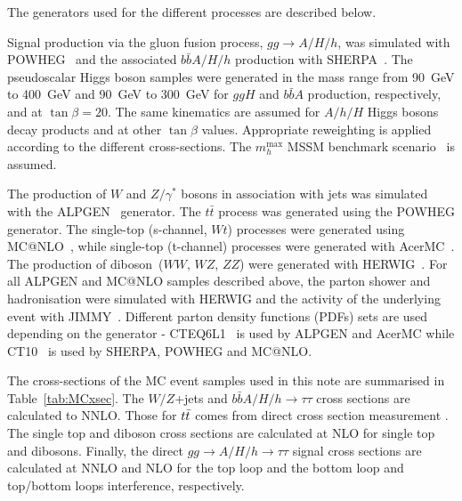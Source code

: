 The generators used for the different processes are described below.

Signal production via the gluon fusion process, $gg\rightarrow A/H/h$,
was simulated with POWHEG~\cite{POWHEG} and the associated
$b\bar{b}A/H/h$ production with SHERPA~\cite{SHERPA}.  The
pseudoscalar Higgs boson samples were generated in the mass range from
90~GeV to 400~GeV and 90~GeV to 300~GeV for $ggH$ and $b\bar{b}A$
production, respectively, and at $\tan\beta = 20$. The same kinematics
are assumed for $A/h/H$ Higgs bosons decay products and at other
$\tan\beta$ values. Appropriate reweighting is applied according to the
different cross-sections. The $m_h^{\mathrm{max}}$ MSSM benchmark
scenario~\cite{MSSMmhmax} is assumed.

The production of $W$ and $Z/\gamma^*$ bosons in association with jets
was simulated with the ALPGEN~\cite{Alpgen} generator. 
The $t\bar{t}$ process was generated using the POWHEG generator. The single-top (s-channel, $Wt$)
processes were generated using MC@NLO~\cite{MCatNLO}, while single-top
(t-channel) processes were generated with AcerMC~\cite{AcerMC}.  The
production of diboson~($WW$, $WZ$, $ZZ$) were generated with
HERWIG~\cite{Herwig}.  For all ALPGEN and MC@NLO samples described
above, the parton shower and hadronisation were simulated with HERWIG
and the activity of the underlying event with JIMMY~\cite{JIMMY}.
Different parton density functions (PDFs) sets are used depending on
the generator - CTEQ6L1~\cite{CTEQ6} is used by ALPGEN and AcerMC while
CT10~\cite{CT10} is used by SHERPA, POWHEG and MC@NLO. 

The cross-sections of
the MC event samples used in this note are summarised in
Table~\ref{tab:MCxsec}. The $W/Z$+jets and $b\bar{b}A/H/h\rightarrow \tau\tau$ cross sections 
are calculated to NNLO. Those for $t\bar{t}$ comes from direct cross section measurement \cite{}. The single top and diboson cross sections are calculated at NLO for single top and dibosons. Finally, the direct $gg\rightarrow A/H/h\rightarrow \tau\tau$ signal cross sections 
are calculated at NNLO and NLO for the top loop and the bottom loop and top/bottom loops interference, respectively.

